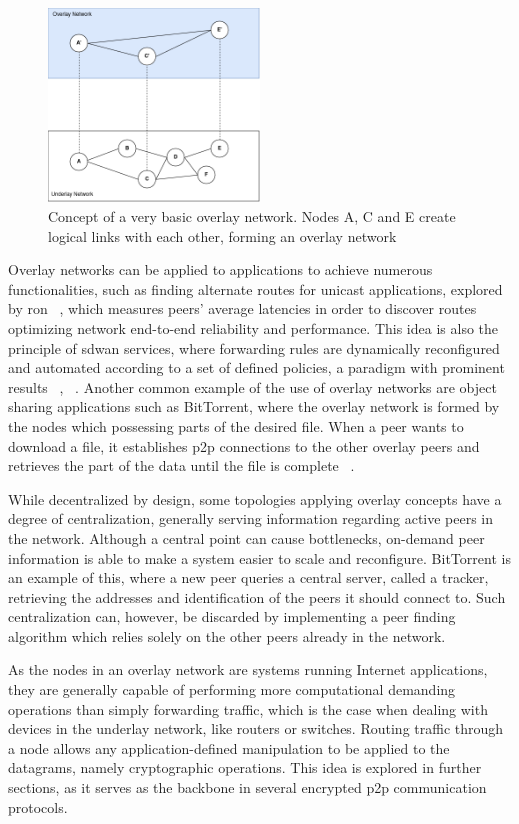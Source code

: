 \documentclass[11pt,twoside,a4paper]{report}
\begin{document}
\begin{figure}[h]
\centering
\includegraphics[width=0.5\textwidth]{overlays.png}
\caption{Concept of a very basic overlay network. Nodes A, C and E create logical links with each other, forming an overlay network}
\label{fig:overlay}
\end{figure}

Overlay networks can be applied to applications to achieve numerous functionalities, such as finding alternate routes for unicast applications, explored by \ac{ron} ~\cite{ron}, which measures peers' average latencies in order to discover routes optimizing network end-to-end reliability and performance. This idea is also the principle of \ac{sdwan} services, where forwarding rules are dynamically reconfigured and automated according to a set of defined policies, a paradigm with prominent results ~\cite{9203058}, ~\cite{9492375}. Another common example of the use of overlay networks are object sharing applications such as BitTorrent, where the overlay network is formed by the nodes which possessing parts of the desired file. When a peer wants to download a file, it establishes \ac{p2p} connections to the other overlay peers and retrieves the part of the data until the file is complete ~\cite{5482574}.

While decentralized by design, some topologies applying overlay concepts have a degree of centralization, generally serving information regarding active peers in the network. Although a central point can cause bottlenecks, on-demand peer information is able to make a system easier to scale and reconfigure. BitTorrent is an example of this, where a new peer queries a central server, called a tracker, retrieving the addresses and identification of the peers it should connect to. Such centralization can, however, be discarded by implementing a peer finding algorithm which relies solely on the other peers already in the network.

As the nodes in an overlay network are systems running Internet applications, they are generally capable of performing more computational demanding operations than simply forwarding traffic, which is the case when dealing with devices in the underlay network, like routers or switches. Routing traffic through a node allows any application-defined manipulation to be applied to the datagrams, namely cryptographic operations. This idea is explored in further sections, as it serves as the backbone in several encrypted \ac{p2p} communication protocols.
\end{document}
